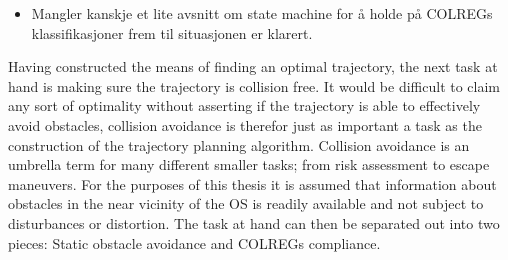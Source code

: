 \begin{itemize}
    \item Mangler kanskje et lite avsnitt om state machine for å holde på COLREGs klassifikasjoner frem til situasjonen er klarert.
\end{itemize}
Having constructed the means of finding an optimal trajectory, the next task at hand is making sure the trajectory is collision free.
It would be difficult to claim any sort of optimality without asserting if the trajectory is able to effectively avoid obstacles, collision avoidance is
therefor just as important a task as the construction of the trajectory planning algorithm. Collision avoidance is an umbrella term for many
different smaller tasks; from risk assessment to escape maneuvers. For the purposes of this thesis it is assumed that information 
about obstacles in the near vicinity of the \gls{OS} is readily available and not subject to disturbances or distortion.
The task at hand can then be separated out into two pieces: Static obstacle avoidance and \gls{COLREGs} compliance. 


